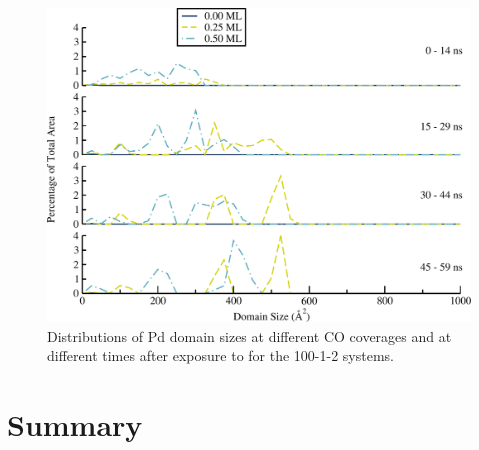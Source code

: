 \begin{figure}[p!]
\centering
  \includegraphics[width=\linewidth]{../figures/appC/ds_100_1Pt_2Pd_Pd.pdf}
  \caption{Distributions of Pd domain sizes at different CO coverages and at
different times after exposure to  for the 100-1-2
systems.}
\label{fig:ds100Pt}
\end{figure}

\section{Summary}
